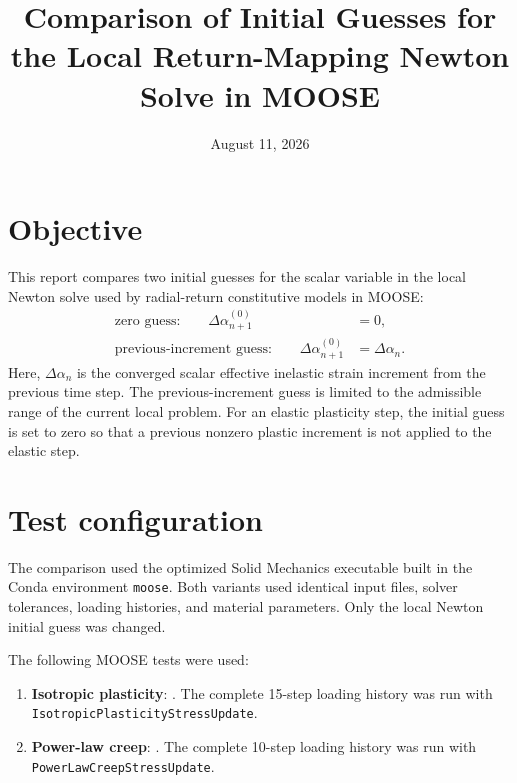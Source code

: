 \documentclass[11pt]{article}
\title{Comparison of Initial Guesses for the Local Return-Mapping Newton Solve in MOOSE}
\author{}
\date{August 11, 2026}
\begin{document}
\maketitle

\section{Objective}

This report compares two initial guesses for the scalar variable in the local Newton solve used by radial-return constitutive models in MOOSE:
\begin{align}
  \text{zero guess:} \qquad
  \Delta\alpha_{n+1}^{(0)} &= 0, \\
  \text{previous-increment guess:} \qquad
  \Delta\alpha_{n+1}^{(0)} &= \Delta\alpha_n.
\end{align}
Here, $\Delta\alpha_n$ is the converged scalar effective inelastic strain increment from the previous time step.  The previous-increment guess is limited to the admissible range of the current local problem.  For an elastic plasticity step, the initial guess is set to zero so that a previous nonzero plastic increment is not applied to the elastic step.

\section{Test configuration}

The comparison used the optimized Solid Mechanics executable built in the Conda environment \texttt{moose}.  Both variants used identical input files, solver tolerances, loading histories, and material parameters.  Only the local Newton initial guess was changed.

The following MOOSE tests were used:
\begin{sloppypar}
\begin{enumerate}
  \item \textbf{Isotropic plasticity}: .  The complete 15-step loading history was run with \texttt{IsotropicPlasticityStressUpdate}.
  \item \textbf{Power-law creep}: .  The complete 10-step loading history was run with \texttt{PowerLawCreepStressUpdate}.
\end{enumerate}
\end{sloppypar}
\end{document}
